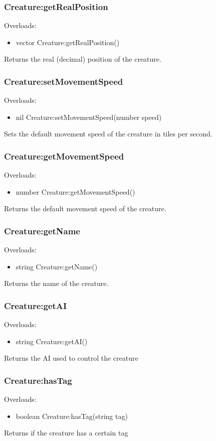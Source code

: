\documentclass{book}
\newenvironment{ulist}
	{\begin{itemize}
			\itemsep0em}
	{\end{itemize}}
\begin{document}
\subsubsection{Creature:getRealPosition}
Overloads:
\begin{ulist}
	\item vector Creature:getRealPosition()
\end{ulist}
Returns the real (decimal) position of the creature.

\subsubsection{Creature:setMovementSpeed}
Overloads:
\begin{ulist}
	\item nil Creature:setMovementSpeed(number speed)
\end{ulist}
Sets the default movement speed of the creature in tiles per second.

\subsubsection{Creature:getMovementSpeed}
Overloads:
\begin{ulist}
	\item number Creature:getMovementSpeed()
\end{ulist}
Returns the default movement speed of the creature.

\subsubsection{Creature:getName}
Overloads:
\begin{ulist}
	\item string Creature:getName()
\end{ulist}
Returns the name of the creature.

\subsubsection{Creature:getAI}
Overloads:
\begin{ulist}
	\item string Creature:getAI()
\end{ulist}
Returns the AI used to control the creature

\subsubsection{Creature:hasTag}
Overloads:
\begin{ulist}
	\item boolean Creature:hasTag(string tag)
\end{ulist}
Returns if the creature has a certain tag
\end{document}
